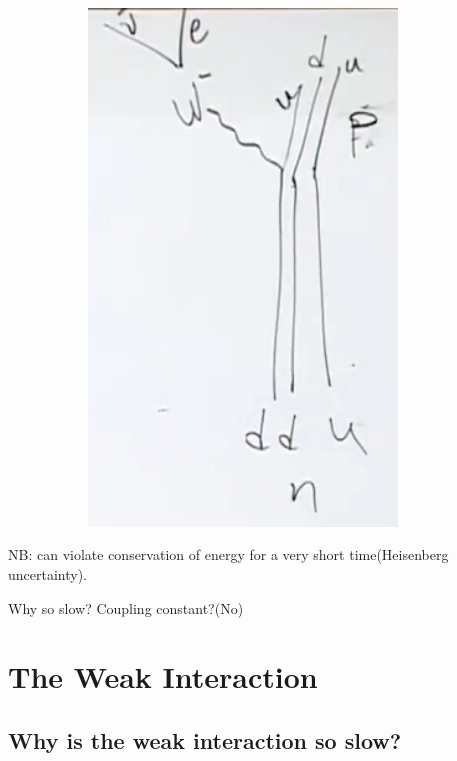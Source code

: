 \documentclass[]{article}
\begin{document}
\begin{figure}[H]
\begin{subfigure}[t]{0.30\textwidth}
		\includegraphics[width=0.9\textwidth]{2-5-neutron-decay}
	\end{subfigure}
\end{figure}

NB: can violate conservation of energy for a very short time(Heisenberg uncertainty).

Why so slow? Coupling constant?(No)

\section{The Weak Interaction}

\subsection{Why is the weak interaction so slow?}
\end{document}
